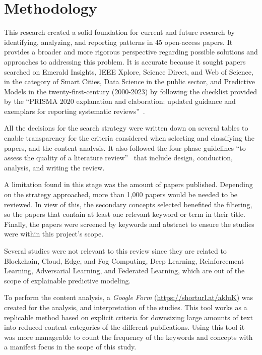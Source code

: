 \documentclass[a4paper,12pt,twoside]{ThesisStyle}
\begin{document}
\chapter{Methodology}

This research created a solid foundation for current and future research by identifying, analyzing, and reporting patterns in 45 open-access papers. It provides a broader and more rigorous perspective regarding possible solutions and approaches to addressing this problem. It is accurate because it sought papers searched on Emerald Insights, IEEE Xplore, Science Direct, and Web of Science, in the category of Smart Cities, Data Science in the public sector, and Predictive Models in the twenty-first-century (2000-2023) by following the checklist provided by the “PRISMA 2020 explanation and elaboration: updated guidance and exemplars for reporting systematic reviews”~\cite{PRISMA2020}. 

All the decisions for the search strategy were written down on several tables to enable transparency for the criteria considered when selecting and classifying the papers, and the content analysis. It also followed the four-phase guidelines “to assess the quality of a literature review”~\cite{guidelinesLRSnyder2019} that include design, conduction, analysis, and writing the review.

A limitation found in this stage was the amount of papers published. Depending on the strategy approached, more than 1,000 papers would be needed to be reviewed. In view of this, the secondary concepts selected benefited the filtering, so the papers that contain at least one relevant keyword or term in their title. Finally, the papers were screened by keywords and abstract to ensure the studies were within this project's scope. 

Several studies were not relevant to this review since they are related to Blockchain, Cloud, Edge, and Fog Computing, Deep Learning, Reinforcement Learning, Adversarial Learning, and Federated Learning, which are out of the scope of explainable predictive modeling. 

To perform the content analysis, a \textit{Google Form} (\url{https://shorturl.at/akluK}) was created for the analysis, and interpretation of the studies. This tool works as a replicable method based on explicit criteria for downsizing large amounts of text into reduced content categories of the different publications. Using this tool it was more manageable to count the frequency of the keywords and concepts with a manifest focus in the scope of this study. 
\end{document}
